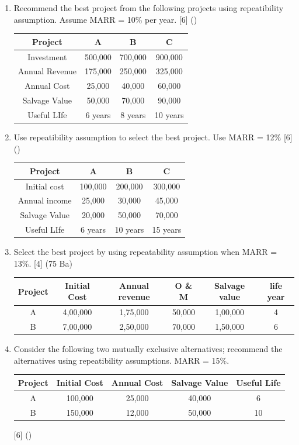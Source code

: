 \documentclass[12pt]{article}
\begin{document}
\begin{enumerate}
		\item Recommend the best project from the following projects using repeatibility assumption. Assume MARR = 10\% per year. \hfill [6] ()\\
		\begin{tabular}{|c|c|c|c|}
			\hline
			Project & A & B & C \\ \hline
			Investment & 500,000 & 700,000 & 900,000 \\ \hline
			Annual Revenue & 175,000 & 250,000 & 325,000 \\ \hline
			Annual Cost & 25,000 & 40,000 & 60,000 \\ \hline
			Salvage Value & 50,000 & 70,000 & 90,000 \\ \hline
			Useful LIfe & 6 years & 8 years & 10 years \\ \hline
		\end{tabular}
		
		\item Use repeatibility assumption to select the best project. Use MARR = 12\% \hfill [6] ()\\
		\begin{tabular}{|c|c|c|c|}
			\hline
			Project & A & B & C \\ \hline
			Initial cost & 100,000 & 200,000 & 300,000 \\ \hline
			Annual income & 25,000 & 30,000 & 45,000 \\ \hline
			Salvage Value & 20,000 & 50,000 & 70,000 \\ \hline
			Useful LIfe & 6 years & 10 years & 15 years \\ \hline
		\end{tabular}
		
		\item Select the best project by using repeatability assumption when MARR = 13\%. \hfill [4] (75 Ba)
		\begin{tabular}{|c|c|c|c|c|c|}
			\hline
			Project & Initial Cost & Annual revenue & O \& M & Salvage value & life year\\ \hline
			A & 4,00,000 & 1,75,000 & 50,000 & 1,00,000 & 4 \\ \hline
			B & 7,00,000 & 2,50,000 & 70,000 & 1,50,000 & 6 \\ \hline
		\end{tabular}
		
		\item Consider the following two mutually exclusive alternatives; recommend the alternatives using repeatibility assumptions. MARR = 15\%.\\
		\begin{tabular}{|c|c|c|c|c|}
			\hline
			Project & Initial Cost & Annual Cost & Salvage Value & Useful Life \\ \hline
			A & 100,000 & 25,000 & 40,000 & 6 \\ \hline
			B & 150,000 & 12,000 & 50,000 & 10 \\ \hline
		\end{tabular} \hfill [6] ()
		

\end{enumerate}
\end{document}

